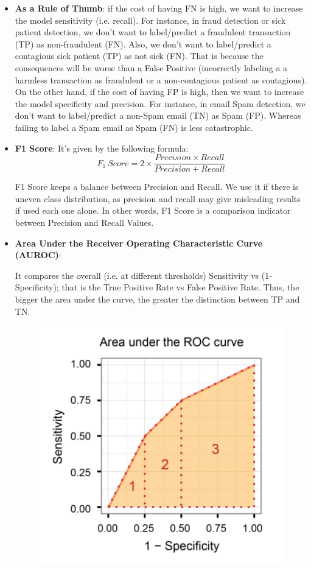 \documentclass[11pt, twocolumn]{article}
\begin{document}
\begin{itemize}
\begin{itemize}
\item \textbf{As a Rule of Thumb}:
if the cost of having FN is high, we want to increase the model {\color{blue}sensitivity} (i.e. recall).
For instance, in fraud detection or sick patient detection, we don't want to label/predict a fraudulent transaction (TP) as non-fraudulent (FN). Also, we don't want to label/predict a contagious sick patient (TP) as not sick (FN). 
That is because the {\color{red}consequences} will be worse than a False Positive (incorrectly labeling a a harmless transaction as fraudulent or a non-contagious patient as contagious).\\
On the other hand, if the cost of having FP is high, then we want to increase the model {\color{blue}specificity} and {\color{blue}precision}.
For instance, in email Spam detection, we don't want to label/predict a non-Spam email (TN) as Spam (FP). Whereas failing to label a Spam email as Spam (FN) is less catastrophic.

 
\item \textbf{F1 Score}: It's given by the following formula:
$$F_1~Score = 2 \times \frac{Precision \times Recall}{Precision + Recall}$$

F1 Score keeps a {\color{blue}balance} between Precision and Recall. We use it if there is {\color{red}uneven class distribution}, as precision and recall may give misleading results if used each one alone.
In other words, F1 Score is a comparison indicator between Precision and Recall Values.

\item \textbf{Area Under the Receiver Operating Characteristic Curve (AUROC)}:

It compares the {\color{blue}overall} (i.e. at different thresholds) Sensitivity vs (1-Specificity); that is the {\color{blue}True Positive Rate} vs {\color{red}False Positive Rate}.
Thus, the bigger the area under the curve, the greater the {\color{blue}distinction} between TP and TN.
\begin{figure}[h!]
  \centering
  \includegraphics[width=0.7\linewidth]{figs/auroc.png}
\end{figure}



\end{itemize}
\end{itemize}
\end{document}

